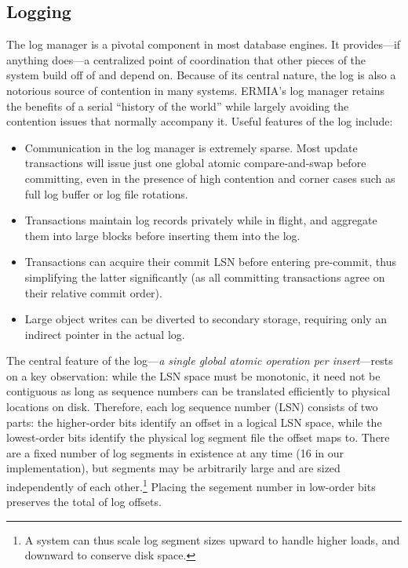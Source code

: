 \subsection{Logging}
\label{subsec:logging}
The log manager is a pivotal component in most database engines. It provides---if anything does---a centralized point of coordination that other pieces of the system build off of and depend on. Because of its central nature, the log is also a notorious source of contention in many systems. ERMIA's log manager retains the benefits of a serial ``history of the world'' while largely avoiding the contention issues that normally accompany it. Useful features of the log include:
\begin{itemize}
\item Communication in the log manager is extremely sparse. Most update transactions will issue just one global atomic compare-and-swap before committing, even in the presence of high contention and corner cases such as full log buffer or log file rotations.
\item Transactions maintain log records privately while in flight, and aggregate them into large blocks before inserting them into the log.
\item Transactions can acquire their commit LSN before entering pre-commit, thus simplifying the latter significantly (as all committing transactions agree on their relative commit order).
\item Large object writes can be diverted to secondary storage, requiring only an indirect pointer in the actual log.
\end{itemize}

The central feature of the log---{\em a single global atomic operation per insert}---rests on a key observation: while the LSN space must be monotonic, it need not be contiguous as long as sequence numbers can be translated efficiently to physical locations on disk. Therefore, each log sequence number (LSN) consists of two parts: the higher-order bits identify an offset in a logical LSN space, while the lowest-order bits identify the physical log segment file the offset maps to. There are a fixed number of log segments in existence at any time (16 in our implementation), but segments may be arbitrarily large and are sized independently of each other.\footnote{A system can thus scale log segment sizes upward to handle higher loads, and downward to conserve disk space.} Placing the segement number in low-order bits preserves the total of log offsets.

